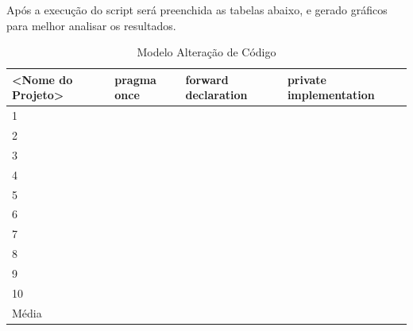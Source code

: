 Após a execução do script será preenchida as tabelas abaixo, e gerado gráficos para melhor
analisar os resultados. 


\begin{table}[!ht]
\centering
\caption{Modelo Alteração de Código}
\label{tab:modelo_alteracao_de_codigo}
\begin{tabular}{llll}
\textbf{<Nome do Projeto>} & \textbf{pragma once} & \textbf{forward declaration} & \textbf{private implementation}   \\ \toprule
1                                    &     &     &        \\ 
2                                    &     &     &        \\ 
3                                    &     &     &        \\ 
4                                    &     &     &        \\ 
5                                    &     &     &        \\ 
6                                    &     &     &        \\ 
7                                    &     &     &        \\ 
8                                    &     &     &        \\ 
9                                    &     &     &        \\ 
10                                   &     &     &        \\ \bottomrule
Média                                &     &     &        \\ 
\end{tabular}
\end{table}


